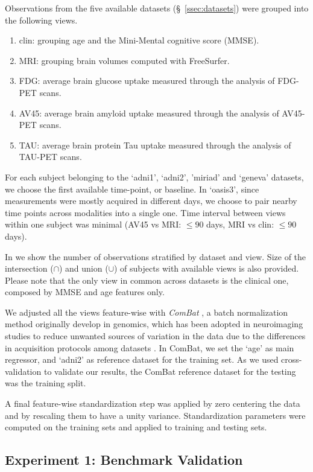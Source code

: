 Observations from the five available datasets (\S~\ref{ssec:datasets}) were grouped into the following views.
\begin{enumerate}
\item clin: grouping age and the Mini-Mental cognitive score (MMSE).
\item MRI: grouping brain volumes computed with FreeSurfer.
\item FDG: average brain glucose uptake measured through the analysis of FDG-PET scans.
\item AV45: average brain amyloid uptake measured through the analysis of AV45-PET scans.
\item TAU: average brain protein Tau uptake measured through the analysis of TAU-PET scans.
\end{enumerate}

For each subject belonging to the `adni1', `adni2', 'miriad' and `geneva' datasets, we choose the first available time-point, or baseline.
In `oasis3', since measurements were mostly acquired in different days, we choose to pair nearby time points across modalities into a single one.
Time interval between views within one subject was minimal (AV45 vs MRI: $\leq 90$ days, MRI vs clin: $\leq 90$ days).

In  we show the number of observations stratified by dataset and view.
Size of the intersection ($\cap$) and union ($\cup$) of subjects with available views is also provided.
Please note that the only view in common across datasets is the clinical one, composed by MMSE and age features only.

We adjusted all the views feature-wise with \textit{ComBat} \citep{combat}, a batch normalization method originally develop in genomics, which has been adopted in neuroimaging studies to reduce unwanted sources of variation in the data due to the differences in acquisition protocols among datasets \citep{Fortin2017, Fortin2018, Orlhac2020}.
In ComBat, we set the `age' as main regressor, and `adni2' as reference dataset for the training set.
As we used cross-validation to validate our results, the ComBat reference dataset for the testing was the training split.

A final feature-wise standardization step was applied by zero centering the data and by rescaling them to have a unity variance.
Standardization parameters were computed on the training sets and applied to training and testing sets.

\subsection{Experiment 1: Benchmark Validation}


